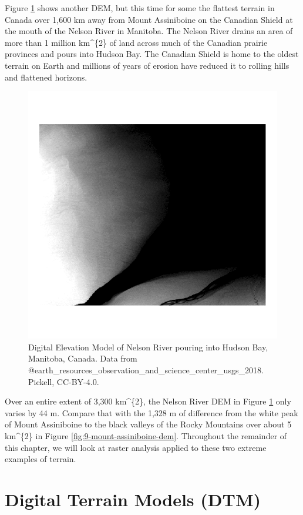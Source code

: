 \documentclass[
]{book}
\begin{document}
Figure \ref{fig:9-nelson-river-dem} shows another DEM, but this time for some the flattest terrain in Canada over 1,600 km away from Mount Assiniboine on the Canadian Shield at the mouth of the Nelson River in Manitoba. The Nelson River drains an area of more than 1 million km\^{}\{2\} of land across much of the Canadian prairie provinces and pours into Hudson Bay. The Canadian Shield is home to the oldest terrain on Earth and millions of years of erosion have reduced it to rolling hills and flattened horizons.

\begin{figure}
\includegraphics[width=0.75\linewidth]{images/09-nelson-river-dem} \caption{Digital Elevation Model of Nelson River pouring into Hudson Bay, Manitoba, Canada. Data from @earth_resources_observation_and_science_center_usgs_2018. Pickell, CC-BY-4.0.}\label{fig:9-nelson-river-dem}
\end{figure}

Over an entire extent of 3,300 km\^{}\{2\}, the Nelson River DEM in Figure \ref{fig:9-nelson-river-dem} only varies by 44 m. Compare that with the 1,328 m of difference from the white peak of Mount Assiniboine to the black valleys of the Rocky Mountains over about 5 km\^{}\{2\} in Figure \ref{fig:9-mount-assiniboine-dem}. Throughout the remainder of this chapter, we will look at raster analysis applied to these two extreme examples of terrain.

\section{Digital Terrain Models (DTM)}\label{digital-terrain-models-dtm}
\end{document}
